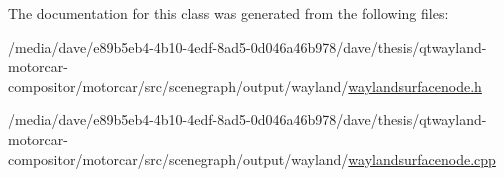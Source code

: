 The documentation for this class was generated from the following files\-:\begin{DoxyCompactItemize}
\item 
/media/dave/e89b5eb4-\/4b10-\/4edf-\/8ad5-\/0d046a46b978/dave/thesis/qtwayland-\/motorcar-\/compositor/motorcar/src/scenegraph/output/wayland/\hyperlink{waylandsurfacenode_8h}{waylandsurfacenode.\-h}\item 
/media/dave/e89b5eb4-\/4b10-\/4edf-\/8ad5-\/0d046a46b978/dave/thesis/qtwayland-\/motorcar-\/compositor/motorcar/src/scenegraph/output/wayland/\hyperlink{waylandsurfacenode_8cpp}{waylandsurfacenode.\-cpp}\end{DoxyCompactItemize}
